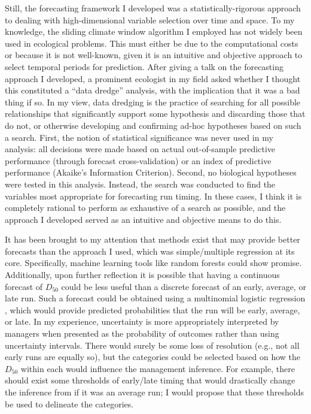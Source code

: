 \documentclass[12pt,]{book}
\theoremstyle{definition}
\theoremstyle{definition}
\theoremstyle{definition}
\theoremstyle{remark}
\begin{document}
Still, the forecasting framework I developed was a
statistically-rigorous approach to dealing with high-dimensional
variable selection over time and space. To my knowledge, the sliding
climate window algorithm I employed has not widely been used in
ecological problems. This must either be due to the computational costs
or because it is not well-known, given it is an intuitive and objective
approach to select temporal periods for prediction. After giving a talk
on the forecasting approach I developed, a prominent ecologist in my
field asked whether I thought this constituted a ``data dredge''
analysis, with the implication that it was a bad thing if so. In my
view, data dredging is the practice of searching for all possible
relationships that significantly support some hypothesis and discarding
those that do not, or otherwise developing and confirming ad-hoc
hypotheses based on such a search. First, the notion of statistical
significance was never used in my analysis: all decisions were made
based on actual out-of-sample predictive performance (through forecast
cross-validation) or an index of predictive performance (Akaike's
Information Criterion). Second, no biological hypotheses were tested in
this analysis. Instead, the search was conducted to find the variables
most appropriate for forecasting run timing. In these cases, I think it
is completely rational to perform as exhaustive of a search as possible,
and the approach I developed served as an intuitive and objective means
to do this.

It has been brought to my attention that methods exist that may provide
better forecasts than the approach I used, which was simple/multiple
regression at its core. Specifically, machine learning tools like random
forests could show promise. Additionally, upon further reflection it is
possible that having a continuous forecast of \(D_{50}\) could be less
useful than a discrete forecast of an early, average, or late run. Such
a forecast could be obtained using a multinomial logistic regression
\citep[Ch. 7]{agresti-2002}, which would provide predicted probabilities
that the run will be early, average, or late. In my experience,
uncertainty is more appropriately interpreted by managers when presented
as the probability of outcomes rather than using uncertainty intervals.
There would surely be some loss of resolution (e.g., not all early runs
are equally so), but the categories could be selected based on how the
\(D_{50}\) within each would influence the management inference. For
example, there should exist some thresholds of early/late timing that
would drastically change the inference from if it was an average run; I
would propose that these thresholds be used to delineate the categories.
\end{document}
